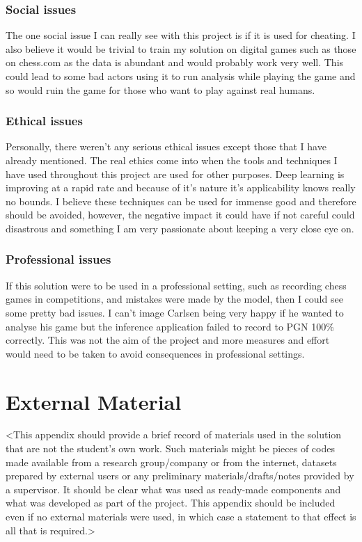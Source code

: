 \begin{appendices}
\subsection{Social issues}
The one social issue I can really see with this project is if it is used for cheating.  I also believe it would be trivial to train my solution on digital games such 
as those on chess.com as the data is abundant and would probably work very well.  This could lead to some bad actors using it to run analysis while playing the game 
and so would ruin the game for those who want to play against real humans.

\subsection{Ethical issues}
Personally, there weren't any serious ethical issues except those that I have already mentioned.  The real ethics come into when the tools and techniques I have used 
throughout this project are used for other purposes.  Deep learning is improving at a rapid rate and because of it's nature it's applicability knows really no bounds.
I believe these techniques can be used for immense good and therefore should be avoided, however, the negative impact it could have if not careful could disastrous and 
something I am very passionate about keeping a very close eye on.

\subsection{Professional issues}
If this solution were to be used in a professional setting, such as recording chess games in competitions, and mistakes were made by the model, then I could see some 
pretty bad issues.  I can't image Carlsen being very happy if he wanted to analyse his game but the inference application failed to record to PGN 100\% correctly. 
This was not the aim of the project and more measures and effort would need to be taken to avoid consequences in professional settings.

%
%
\chapter{External Material}
<This appendix should provide a brief record of materials used in the solution that are not the student's own work. Such materials might be pieces of codes made available from a research group/company or from the internet, datasets prepared by external users or any preliminary materials/drafts/notes provided by a supervisor. It should be clear what was used as ready-made components and what was developed as part of the project. This appendix should be included even if no external materials were used, in which case a statement to that effect is all that is required.>




%
%



\end{appendices}
